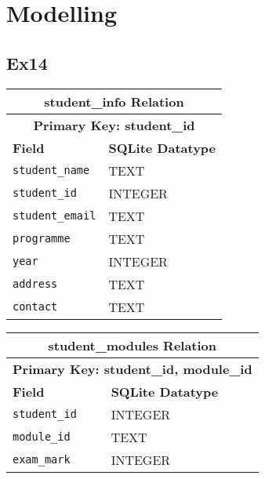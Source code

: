 \documentclass{article}
\begin{document}
\section{Modelling}
\subsection{Ex14}

\begin{table}[H]
    \centering
    \begin{tabularx}{\textwidth}{|X|X|}
    \hline
    \multicolumn{2}{|c|}{\textbf{student\_info Relation}} \\
    \hline
        \multicolumn{2}{|c|}{\textbf{Primary Key: student\_id}} \\
        \hline
        \textbf{Field} & \textbf{SQLite Datatype} \\
        \hline
        \verb|student_name| & TEXT \\
        \hline
        \verb|student_id| & INTEGER \\
        \hline
        \verb|student_email| & TEXT \\
        \hline
        \verb|programme| & TEXT \\
        \hline
        \verb|year| & INTEGER \\
        \hline
        \verb|address| & TEXT \\
        \hline
        \verb|contact| & TEXT \\
        \hline
    \end{tabularx}
\end{table}

\begin{table}[H]
    \centering
    \begin{tabularx}{\textwidth}{|X|X|} 
    \hline
    \multicolumn{2}{|c|}{\textbf{student\_modules Relation}} \\
        \hline
    \multicolumn{2}{|c|}{\textbf{Primary Key: student\_id, module\_id}} \\
    \hline
        \textbf{Field} & \textbf{SQLite Datatype} \\
        \hline
        \verb|student_id| & INTEGER \\
        \hline
        \verb|module_id| & TEXT \\
        \hline
        \verb|exam_mark| & INTEGER \\
        \hline
    \end{tabularx}
\end{table}
\end{document}
